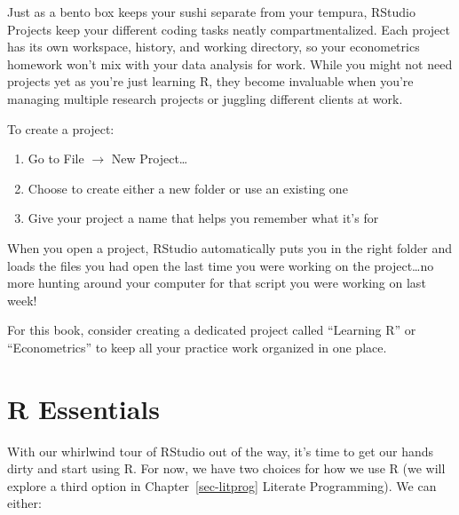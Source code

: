 \documentclass[
  letterpaper,
]{book}
\providecommand{\tightlist}{%
  \setlength{\itemsep}{0pt}\setlength{\parskip}{0pt}}\usepackage{longtable,booktabs,array}
\begin{document}
\begin{tcolorbox}[enhanced jigsaw, colframe=quarto-callout-tip-color-frame, breakable, arc=.35mm, bottomtitle=1mm, bottomrule=.15mm, colbacktitle=quarto-callout-tip-color!10!white, rightrule=.15mm, colback=white, opacityback=0, opacitybacktitle=0.6, coltitle=black, left=2mm, toptitle=1mm, toprule=.15mm, titlerule=0mm, leftrule=.75mm, title=\textcolor{quarto-callout-tip-color}{\faLightbulb}\hspace{0.5em}{Tip from the Helpdesk: Projects: the Bento Boxes of R}]

Just as a bento box keeps your sushi separate from your tempura, RStudio
Projects keep your different coding tasks neatly compartmentalized. Each
project has its own workspace, history, and working directory, so your
econometrics homework won't mix with your data analysis for work. While
you might not need projects yet as you're just learning R, they become
invaluable when you're managing multiple research projects or juggling
different clients at work.

To create a project:

\begin{enumerate}
\def\labelenumi{\arabic{enumi}.}
\tightlist
\item
  Go to File \(\rightarrow\) New Project\ldots{}
\item
  Choose to create either a new folder or use an existing one
\item
  Give your project a name that helps you remember what it's for
\end{enumerate}

When you open a project, RStudio automatically puts you in the right
folder and loads the files you had open the last time you were working
on the project\ldots no more hunting around your computer for that
script you were working on last week!

For this book, consider creating a dedicated project called ``Learning
R'' or ``Econometrics'' to keep all your practice work organized in one
place.

\end{tcolorbox}

\section{R Essentials}\label{r-essentials}

With our whirlwind tour of RStudio out of the way, it's time to get our
hands dirty and start using R. For now, we have two choices for how we
use R (we will explore a third option in Chapter~\ref{sec-litprog}
Literate Programming). We can either:
\end{document}
